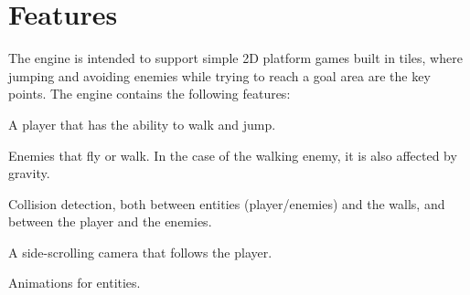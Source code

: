 \section{Features}
\label{02}

The engine is intended to support simple 2D platform games built in tiles, where jumping and avoiding enemies while trying to reach a goal area are the key points. The engine contains the following features:

\begin{my_itemize}

	\item A player that has the ability to walk and jump.

	\item Enemies that fly or walk. In the case of the walking enemy, it is also affected by gravity.

	\item Collision detection, both between entities (player/enemies) and the walls, and between the player and the enemies.

	\item A side-scrolling camera that follows the player.

	\item Animations for entities.

\end{my_itemize}

